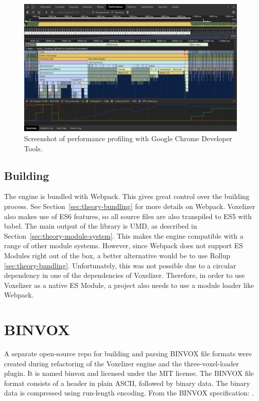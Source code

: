 \begin{figure}[ht]
    \centering
    \includegraphics[width=\textwidth]{sections/methodology/figures/chrome-dev-tools-performance.png}
    \caption{Screenshot of performance profiling with Google Chrome Developer Tools.}
    \label{fig:chrome-devtools-performance}
\end{figure}

\subsection{Building}
The engine is bundled with Webpack. This gives great control over the building process. See Section~\ref{sec:theory-bundling} for more details on Webpack. Voxelizer also makes use of ES6 features, so all source files are also transpiled to ES5 with babel. The main output of the library is UMD, as described in Section~\ref{sec:theory-module-system}. This makes the engine compatible with a range of other module systems. However, since Webpack does not support ES Modules right out of the box, a better alternative would be to use Rollup \ref{sec:theory-bundling}. Unfortunately, this was not possible due to a circular dependency in one of the dependencies of Voxelizer. Therefore, in order to use Voxelizer as a native ES Module, a project also needs to use a module loader like Webpack.

\section{BINVOX}
\label{sec:method-binvox}
A separate open-source repo for building and parsing BINVOX file formats were created during refactoring of the Voxelizer engine and the three-voxel-loader plugin. It is named binvox and licensed under the MIT license. The BINVOX file format consists of a header in plain ASCII, followed by binary data. The binary data is compressed using run-length encoding. From the BINVOX specification: .

